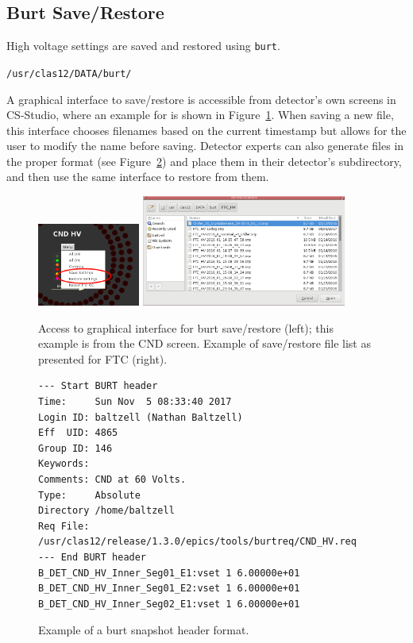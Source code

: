 \documentclass[amsmath,amssymb,notitlepage,11pt]{revtex4}
\begin{document}
\clearpage
\begin{appendices}

\section{Burt Save/Restore}\label{sec:burt}
High voltage settings are saved and restored using \texttt{burt}.
\begin{center}\texttt{/usr/clas12/DATA/burt/}\end{center}
    A graphical interface to save/restore is accessible from detector's own screens in CS-Studio, where an example for is shown in Figure~\ref{fig:burt}.  When saving a new file, this interface chooses filenames based on the current timestamp but allows for the user to modify the name before saving.  Detector experts can also generate files in the proper format (see Figure~\ref{fig:burt3}) and place them in their detector's subdirectory, and then use the same interface to restore from them.
\begin{figure}[htbp]\centering
    \includegraphics[width=0.3\textwidth]{pics/burt1}
    \includegraphics[width=0.6\textwidth]{pics/burt2}
    \caption{Access to graphical interface for burt save/restore (left); this example is from the CND screen.  Example of save/restore file list as presented for FTC (right).\label{fig:burt}}
\end{figure}

\begin{figure}[htbp]\centering
\begin{verbatim}
--- Start BURT header
Time:     Sun Nov  5 08:33:40 2017
Login ID: baltzell (Nathan Baltzell)
Eff  UID: 4865
Group ID: 146
Keywords: 
Comments: CND at 60 Volts. 
Type:     Absolute
Directory /home/baltzell
Req File: /usr/clas12/release/1.3.0/epics/tools/burtreq/CND_HV.req
--- End BURT header
B_DET_CND_HV_Inner_Seg01_E1:vset 1 6.00000e+01
B_DET_CND_HV_Inner_Seg01_E2:vset 1 6.00000e+01
B_DET_CND_HV_Inner_Seg02_E1:vset 1 6.00000e+01
\end{verbatim}
    \caption{Example of a burt snapshot header format.\label{fig:burt3}}
\end{figure}

\end{appendices}

%
\end{document}
